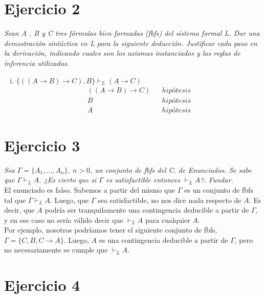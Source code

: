 \documentclass[osajnl,twocolumn,showpacs,superscriptaddress,10pt,leqno]{revtex4-1} %
\begin{document}
\section{Ejercicio 2}

\textit{Sean A , B y C tres fórmulas bien formadas (fbfs) del sistema formal L. Dar una demostración sintáctica en L para la siguiente deducción. Justificar cada paso en la derivación, indicando cuales son los axiomas instanciados y las reglas de inferencia utilizadas.}

\begin{enumerate}[i.]
    \item $\{((A \rightarrow B) \rightarrow C), B\} \vdash_L (A \rightarrow C)$ \\

    \begin{align}
        ((A \rightarrow B) \rightarrow C) && hipótesis \\
        B && hipótesis \\
        A && hipótesis
    \end{align}
\end{enumerate}

\section{Ejercicio 3}

\textit{Sea $\Gamma = \{A_1,\ldots, A_n\}$, $n > 0$, un conjunto de fbfs del C. de Enunciados. Se sabe que $\Gamma \vdash_L A$. ¿Es cierto que si $\Gamma$ es satisfactible entonces $\vdash_L A$?. Fundar.} \\

El enunciado es falso. Sabemos a partir del mismo que $\Gamma$ es un conjunto de fbfs tal que $\Gamma \vdash_L A$. Luego, que $\Gamma$ sea satisfactible, no nos dice nada respecto de $A$. Es decir, que $A$ podría ser tranquilamente
una contingencia deducible a partir de $\Gamma$, y en ese caso no sería válido decir que $\vdash_L A$ para cualquier $A$. \\

Por ejemplo, nosotros podríamos tener el siguiente conjunto de fbfs, $\Gamma = \{ C, B, C \rightarrow A \}$. Luego, $A$ es una contingencia deducible a partir de $\Gamma$,
pero no necesariamente se cumple que $\vdash_L A$.

\section{Ejercicio 4}
\end{document}
